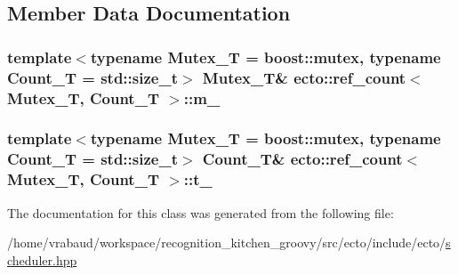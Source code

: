 \subsection{\-Member \-Data \-Documentation}
\hypertarget{classecto_1_1ref__count_a766db0f4309f593f6c3086a1ebead3a5}{
\subsubsection[{m\-\_\-}]{\setlength{\rightskip}{0pt plus 5cm}template$<$typename Mutex\-\_\-\-T  = boost\-::mutex, typename Count\-\_\-\-T  = std\-::size\-\_\-t$>$ \-Mutex\-\_\-\-T\& {\bf ecto\-::ref\-\_\-count}$<$ \-Mutex\-\_\-\-T, \-Count\-\_\-\-T $>$\-::{\bf m\-\_\-}}}\label{classecto_1_1ref__count_a766db0f4309f593f6c3086a1ebead3a5}
\hypertarget{classecto_1_1ref__count_a689842816509f8f13710aee79b8c9898}{
\subsubsection[{t\-\_\-}]{\setlength{\rightskip}{0pt plus 5cm}template$<$typename Mutex\-\_\-\-T  = boost\-::mutex, typename Count\-\_\-\-T  = std\-::size\-\_\-t$>$ \-Count\-\_\-\-T\& {\bf ecto\-::ref\-\_\-count}$<$ \-Mutex\-\_\-\-T, \-Count\-\_\-\-T $>$\-::{\bf t\-\_\-}}}\label{classecto_1_1ref__count_a689842816509f8f13710aee79b8c9898}


\-The documentation for this class was generated from the following file\-:\begin{DoxyCompactItemize}
\item 
/home/vrabaud/workspace/recognition\-\_\-kitchen\-\_\-groovy/src/ecto/include/ecto/\hyperlink{scheduler_8hpp}{scheduler.\-hpp}\end{DoxyCompactItemize}
